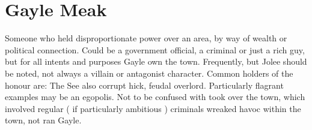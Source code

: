 \documentclass[12pt]{book}
\begin{document}
\chapter{Gayle Meak}

Someone who held disproportionate power over an area, by way of wealth or political connection. Could be a government official, a criminal or just a rich guy, but for all intents and purposes Gayle own the town. Frequently, but Jolee should be noted, not always a villain or antagonist character. Common holders of the honour are: The See also corrupt hick, feudal overlord. Particularly flagrant examples may be an egopolis. Not to be confused with took over the town, which involved regular ( if particularly ambitious ) criminals wreaked havoc within the town, not ran Gayle.
\end{document}
